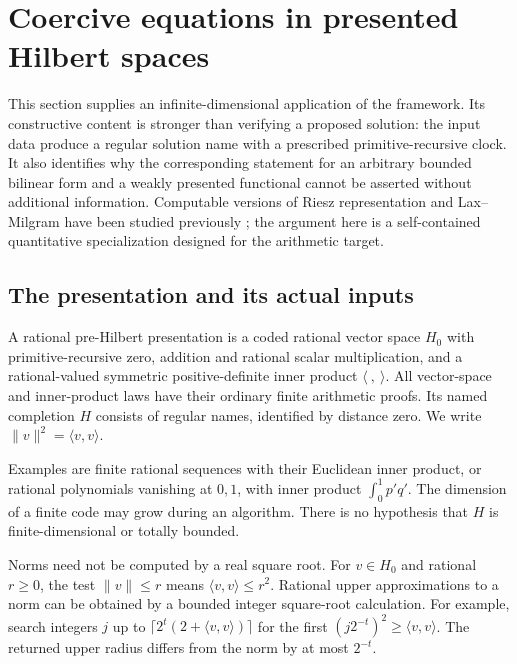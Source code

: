 \section{Coercive equations in presented Hilbert spaces}
\label{sec:hilbert}

This section supplies an infinite-dimensional application of the framework.
Its constructive content is stronger than verifying a proposed solution:
the input data produce a regular solution name with a prescribed
primitive-recursive clock. It also identifies why the corresponding statement
for an arbitrary bounded bilinear form and a weakly presented functional
cannot be asserted without additional information. Computable versions of
Riesz representation and Lax--Milgram have been studied previously
\cite{BrattkaYoshikawa2006}; the argument here is a self-contained quantitative
specialization designed for the arithmetic target.

\subsection{The presentation and its actual inputs}

\begin{definition}
A rational pre-Hilbert presentation is a coded rational vector space \(H_0\)
with primitive-recursive zero, addition and rational scalar multiplication,
and a rational-valued symmetric positive-definite inner product
\(\langle\ ,\ \rangle\). All vector-space and inner-product laws have their
ordinary finite arithmetic proofs. Its named completion \(H\) consists of
regular names, identified by distance zero. We write
\(\|v\|^2=\langle v,v\rangle\).
\end{definition}

Examples are finite rational sequences with their Euclidean inner product,
or rational polynomials vanishing at \(0,1\), with inner product
\(\int_0^1p'q'\). The dimension of a finite code may grow during an
algorithm. There is no hypothesis that \(H\) is finite-dimensional or totally
bounded.

Norms need not be computed by a real square root. For \(v\in H_0\) and
rational \(r\geq0\), the test \(\|v\|\leq r\) means
\(\langle v,v\rangle\leq r^2\). Rational upper approximations to a norm can
be obtained by a bounded integer square-root calculation. For example,
search integers \(j\) up to
\(\lceil2^t(2+\langle v,v\rangle)\rceil\) for the first
\((j2^{-t})^2\geq\langle v,v\rangle\).
The returned upper radius differs from the norm by at most \(2^{-t}\).

